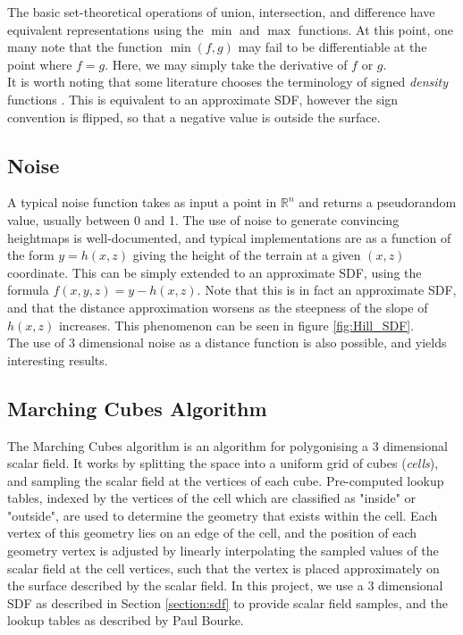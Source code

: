 \documentclass{article}
\begin{document}
The basic set-theoretical operations of union, intersection, and difference have equivalent representations using the $\min$ and $\max$ functions. At this point, one many note that the function $\min\left(f,g\right)$ may fail to be differentiable at the point where $f = g$. Here, we may simply take the derivative of $f$ or $g$. 
\\
It is worth noting that some literature chooses the terminology of signed \textit{density} functions \cite{nguyen_geiss_2007}. This is equivalent to an approximate SDF, however the sign convention is flipped, so that a negative value is outside the surface.\\

\subsection{Noise}
A typical noise function takes as input a point in $\mathbb{R}^n$ and returns a pseudorandom value, usually between 0 and 1. The use of noise to generate convincing heightmaps is well-documented, and typical implementations are as a function of the form $y = h\left(x,z\right)$ giving the height of the terrain at a given $\left(x,z\right)$ coordinate. This can be simply extended to an approximate SDF, using the formula $f\left(x,y,z\right) = y - h\left(x,z\right)$. Note that this is in fact an approximate SDF, and that the distance approximation worsens as the steepness of the slope of $h\left(x,z\right)$ increases. This phenomenon can be seen in figure \ref{fig:Hill_SDF}.
\\
The use of 3 dimensional noise as a distance function is also possible, and yields interesting results. %

\subsection{Marching Cubes Algorithm}
\label{section:mc}
The Marching Cubes algorithm is an algorithm for polygonising a 3 dimensional scalar field. It works by splitting the space into a uniform grid of cubes (\textit{cells}), and sampling the scalar field at the vertices of each cube. Pre-computed lookup tables, indexed by the vertices of the cell which are classified as "inside" or "outside", are used to determine the geometry that exists within the cell. Each vertex of this geometry lies on an edge of the cell, and the position of each geometry vertex is adjusted by linearly interpolating the sampled values of the scalar field at the cell vertices, such that the vertex is placed approximately on the surface described by the scalar field. In this project, we use a 3 dimensional SDF as described in Section \ref{section:sdf} to provide scalar field samples, and the lookup tables as described by Paul Bourke. \cite{bourke_1994}
\end{document}
